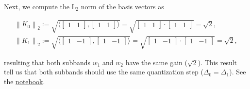 Next, we compute the L$_2$ norm of the basis vectors as

\begin{equation}
  \begin{array}{l}
    \left\| K_0 \right\|_2 := \sqrt{\langle \begin{bmatrix}1 & 1\end{bmatrix}, \begin{bmatrix}1 & 1\end{bmatrix} \rangle} = \sqrt{\begin{bmatrix}1 & 1\end{bmatrix}\cdot \begin{bmatrix}1 & 1\end{bmatrix}} = \sqrt{2},\\
    \left\| K_1 \right\|_2 := \sqrt{\langle \begin{bmatrix}1 & -1\end{bmatrix}, \begin{bmatrix}1 & -1\end{bmatrix} \rangle} = \sqrt{\begin{bmatrix}1 & -1\end{bmatrix}\cdot \begin{bmatrix}1 & -1\end{bmatrix}} = \sqrt{2},
  \end{array}
\end{equation}

resulting that both subbands $w_1$ and $w_2$ have the same gain
($\sqrt{2}$). This result tell us that both subbands should use the
same quantization step ($\Delta_0=\Delta_1$). See the
\href{https://github.com/Tecnologias-multimedia/intercom/blob/master/docs/stereo_transforms_RD.ipynb}{notebook}.

